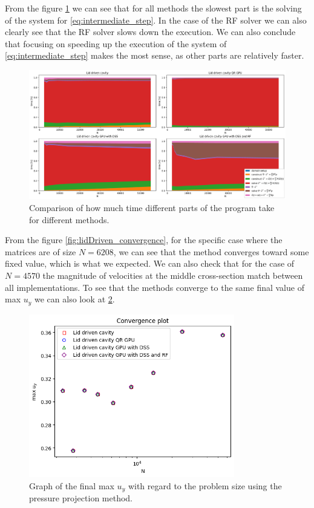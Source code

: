 \documentclass{article}
\begin{document}
From the figure \ref{fig:lidDriven_comp} we can see that for all methods the slowest part is 
the solving of the system for \ref{eq:intermediate_step}. In the case of the RF solver we can also 
clearly see that the RF solver slows down the execution. We can also conclude that focusing on 
speeding up the execution of the system of \ref{eq:intermediate_step} makes the most sense,
as other parts are relatively faster.
\begin{figure}[h!] 
    \centering 
    \includegraphics[width=\textwidth]{plots/lidDriven_comp.png} 
    \caption{Comparison of how much time different parts of the program take for different methods.} 
    \label{fig:lidDriven_comp} 
\end{figure}
From the figure \ref{fig:lidDriven_convergence}, for the specific case where the matrices 
are of size \(N = 6208\), we can see that the 
method converges toward some fixed value, which is what we expected. 
We can also check that for the case of \(N = 4570\) the magnitude of velocities at the middle cross-section 
match between all implementations. To see that the methods converge to the same final value of 
max \(u_y\) we can also look at \ref{fig:lidDriven_conv}.
\begin{figure}[h!] 
    \centering 
    \includegraphics[width=0.8\textwidth]{plots/lidDriven_conv.png} 
    \caption{Graph of the final max $u_y$ with regard to the problem size using the pressure projection method.} 
    \label{fig:lidDriven_conv} 
\end{figure}
\end{document}
